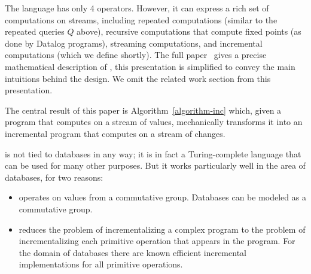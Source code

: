 
The \dbsp language has only 4 operators.  However, it can express a
rich set of computations on streams, including repeated computations
(similar to the repeated queries $Q$ above), recursive computations
that compute fixed points (as done by Datalog programs), streaming
computations, and incremental computations (which we define shortly).
The full paper~\cite{budiu-vldb23} gives a precise mathematical
description of \dbsp, this presentation is simplified to convey the
main intuitions behind the design.  We omit the related work section
from this presentation.

The central result of this paper is Algorithm~\ref{algorithm-inc}
which, given a \dbsp program that computes on a stream of values,
mechanically transforms it into an incremental \dbsp program that
computes on a stream of changes.

\dbsp is not tied to databases in any way; it is in fact a
Turing-complete language that can be used for many other purposes.
But it works particularly well in the area of databases, for two
reasons:

\begin{itemize}[nosep, leftmargin=0pt, itemindent=0.5cm]
  \item \dbsp operates on values from a commutative group.  Databases
    can be modeled as a commutative group.
  \item \dbsp reduces the problem of incrementalizing a complex
    program to the problem of incrementalizing each primitive
    operation that appears in the program.  For the domain of
    databases there are known efficient incremental implementations
    for all primitive operations.
\end{itemize}

